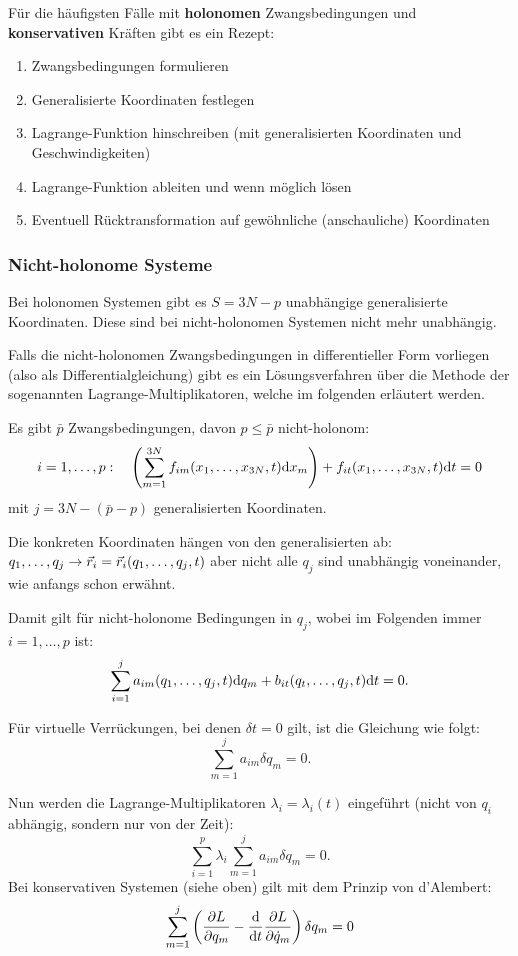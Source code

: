 Für die häufigsten Fälle mit \textbf{holonomen} Zwangsbedingungen und \textbf{konservativen} Kräften gibt es ein Rezept:
\begin{enumerate}
\item Zwangsbedingungen formulieren
\item Generalisierte Koordinaten festlegen
\item Lagrange-Funktion hinschreiben (mit generalisierten Koordinaten und Geschwindigkeiten)
\item Lagrange-Funktion ableiten und wenn möglich lösen
\item Eventuell Rücktransformation auf gewöhnliche (anschauliche) Koordinaten
\end{enumerate}

\subsubsection{Nicht-holonome Systeme}
Bei holonomen Systemen gibt es $S = 3N - p$ unabhängige generalisierte Koordinaten. Diese sind bei nicht-holonomen Systemen nicht mehr unabhängig.

Falls die nicht-holonomen Zwangsbedingungen in differentieller Form vorliegen (also als Differentialgleichung) gibt es ein Lösungsverfahren über die Methode der sogenannten Lagrange-Multiplikatoren, welche im folgenden erläutert werden.

Es gibt $\bar{p}$ Zwangsbedingungen, davon $p \leq \bar{p}$ nicht-holonom: 
\[
	i = 1, \dots, p: 
	\quad 
	\left( \sum_{m=1}^{3N} f_{im}(x_1, \dots, x_{3N}, t) \mathrm d x_m \right) + f_{it}(x_1, \dots, x_{3N}, t) \mathrm d t = 0
\]
mit $j = 3N - (\bar{p} - p)$ generalisierten Koordinaten.

Die konkreten Koordinaten hängen von den generalisierten ab: $q_1, \dots, q_j \rightarrow \vec{r}_i = \vec{r}_i(q_1, \dots, q_j, t)$ aber nicht alle $q_j$ sind unabhängig voneinander, wie anfangs schon erwähnt.

Damit gilt für nicht-holonome Bedingungen in $q_j$, wobei im Folgenden immer $i = 1, \dots, p$ ist:
\[
	\sum_{i=1}^j a_{im}(q_1, \dots, q_j, t) \mathrm d q_m + b_{it}(q_t, \dots, q_j, t) \mathrm d t = 0
	\text{.}
\]

Für virtuelle Verrückungen, bei denen $\delta t = 0$ gilt, ist die Gleichung wie folgt:
\[
	\sum_{m=1}^j a_{im} \delta q_m = 0
	\text{.}
\]

Nun werden die Lagrange-Multiplikatoren $\lambda_i = \lambda_i(t)$ eingeführt (nicht von $q_i$ abhängig, sondern nur von der Zeit):
\[
	\sum_{i=1}^{p} \lambda_i \sum_{m=1}^j a_{im} \delta q_m = 0
	\text{.}
\]
Bei konservativen Systemen (siehe oben) gilt mit dem Prinzip von d'Alembert:
\[
	\sum_{m=1}^j \left( \frac{\partial L}{\partial q_m} - \frac{\mathrm d}{\mathrm d t} \frac{\partial L}{\partial \dot{q}_m} \right) \delta q_m = 0
\]

